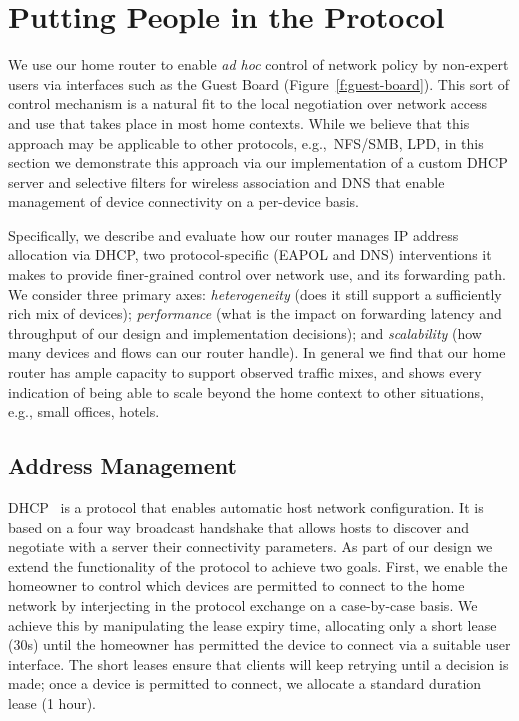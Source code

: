 \section{Putting People in the Protocol} \label{s:protocols}

We use our home router to enable \emph{ad hoc} control of network policy by
non-expert users via interfaces such as the Guest Board
(Figure~\ref{f:guest-board}).  This sort of control mechanism is a natural fit
to the local negotiation over network access and use that takes place in most
home contexts.  While we believe that this approach may be applicable to other
protocols, e.g.,~NFS/SMB, LPD, in this section we demonstrate this approach via
our implementation of a custom DHCP server and selective filters for wireless
association and DNS that enable management of device connectivity on a
per-device basis. 

Specifically, we describe and evaluate how our router manages IP address
allocation via DHCP, two protocol-specific (EAPOL and DNS) interventions it
makes to provide finer-grained control over network use, and its forwarding
path.  We consider three primary axes: \emph{heterogeneity} (does it still
support a sufficiently rich mix of devices); \emph{performance} (what is the
impact on forwarding latency and throughput of our design and implementation
decisions); and \emph{scalability} (how many devices and flows can our router
handle).  In general we find that our home router has ample capacity to support
observed traffic mixes, and shows every indication of being able to scale beyond
the home context to other situations, e.g., small offices, hotels. 

\subsection{Address Management} \label{s:addresses}

DHCP~ is a protocol that enables automatic host network
configuration. It is based on a four way broadcast handshake that allows hosts
to discover and negotiate with a server their connectivity parameters.  As part
of our design we extend the functionality of the protocol to achieve two goals.
First, we enable the homeowner to control which devices are permitted to connect
to the home network by interjecting in the protocol exchange on a case-by-case
basis.  We achieve this by manipulating the lease expiry time, allocating only a
short lease (30s) until the homeowner has permitted the device to connect via a
suitable user interface.  The short leases ensure that clients will keep
retrying until a decision is made; once a device is permitted to connect, we
allocate a standard duration lease (1 hour).

